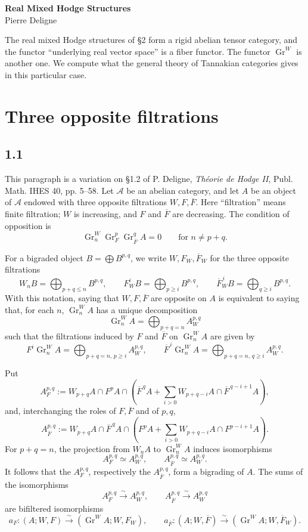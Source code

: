 \documentclass[11pt]{article}
\newcommand{\Gr}{\operatorname{Gr}}
\begin{document}
\begin{center}
 {\Large\bfseries Real Mixed Hodge Structures}\\[0.7em]
 {\large Pierre Deligne}\\[0.4em]
 \end{center}

The real mixed Hodge structures of \S2 form a rigid abelian tensor category, and the functor ``underlying real vector space'' is a fiber functor.  The functor \(\Gr^W\) is another one.  We compute what the general theory of Tannakian categories gives in this particular case.

\section{Three opposite filtrations}

\subsection*{1.1}
This paragraph is a variation on \S1.2 of P. Deligne, \emph{Théorie de Hodge II}, Publ. Math. IHES 40, pp. 5--58.  Let \(\mathcal A\) be an abelian category, and let \(A\) be an object of \(\mathcal A\) endowed with three opposite filtrations \(W,F,\overline F\).  Here ``filtration'' means finite filtration; \(W\) is increasing, and \(F\) and \(\overline F\) are decreasing.  The condition of opposition is
\[
   \Gr^W_n\Gr^p_F\Gr^q_{\overline F} A=0
   \qquad\text{for } n\ne p+q .
\]

For a bigraded object \(B=\bigoplus B^{p,q}\), we write \(W,F_W,\overline F_W\) for the three opposite filtrations
\[
 W_nB=\bigoplus_{p+q\le n}B^{p,q},\qquad
 F_W^iB=\bigoplus_{p\ge i}B^{p,q},\qquad
 \overline F_W^{\,i}B=\bigoplus_{q\ge i}B^{p,q}.
\]
With this notation, saying that \(W,F,\overline F\) are opposite on \(A\) is equivalent to saying that, for each \(n\), \(\Gr^W_nA\) has a unique decomposition
\[
   \Gr^W_nA=\bigoplus_{p+q=n} A_W^{p,q}
\]
such that the filtrations induced by \(F\) and \(\overline F\) on \(\Gr^W_nA\) are given by
\[
 F^i\Gr^W_nA=\bigoplus_{p+q=n,\,p\ge i}A_W^{p,q},\qquad
 \overline F^{\,i}\Gr^W_nA=\bigoplus_{p+q=n,\,q\ge i}A_W^{p,q}.
\]

Put
\[
 A_F^{p,q}:=W_{p+q}A\cap F^pA\cap
 \left(\overline F^{\,q}A+\sum_{i>0}W_{p+q-i}A\cap \overline F^{\,q-i+1}A\right),
\]
and, interchanging the roles of \(F,\overline F\) and of \(p,q\),
\[
 A_{\overline F}^{p,q}:=W_{p+q}A\cap \overline F^{\,q}A\cap
 \left(F^pA+\sum_{i>0}W_{p+q-i}A\cap F^{p-i+1}A\right).
\]
For \(p+q=n\), the projection from \(W_nA\) to \(\Gr^W_nA\) induces isomorphisms
\[
 A_F^{p,q}\simeq A_W^{p,q},\qquad
 A_{\overline F}^{p,q}\simeq A_W^{p,q}.
\]
It follows that the \(A_F^{p,q}\), respectively the \(A_{\overline F}^{p,q}\), form a bigrading of \(A\).  The sums of the isomorphisms
\[
 A_F^{p,q}\xrightarrow{\sim}A_W^{p,q},\qquad
 A_{\overline F}^{p,q}\xrightarrow{\sim}A_W^{p,q}
\]
are bifiltered isomorphisms
\[
 a_F:(A;W,F)\xrightarrow{\sim}(\Gr^WA;W,F_W),
 \qquad
 a_{\overline F}:(A;W,\overline F)\xrightarrow{\sim}(\Gr^WA;W,\overline F_W).
\]
\end{document}
